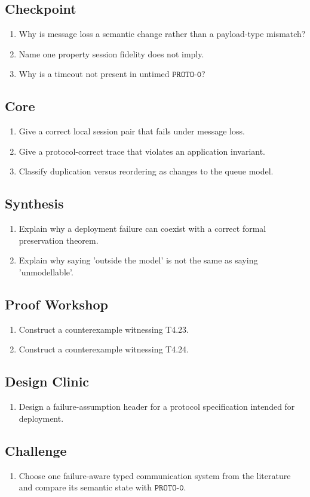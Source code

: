 \subsection*{Checkpoint}
\begin{enumerate}[label=\textbf{11.\arabic*},start=1]
\item Why is message loss a semantic change rather than a payload-type mismatch?
\item Name one property session fidelity does not imply.
\item Why is a timeout not present in untimed $\texttt{PROTO-0}$?
\end{enumerate}
\subsection*{Core}
\begin{enumerate}[label=\textbf{11.\arabic*},start=4]
\item Give a correct local session pair that fails under message loss.
\item Give a protocol-correct trace that violates an application invariant.
\item Classify duplication versus reordering as changes to the queue model.
\end{enumerate}
\subsection*{Synthesis}
\begin{enumerate}[label=\textbf{11.\arabic*},start=7]
\item Explain why a deployment failure can coexist with a correct formal preservation theorem.
\item Explain why saying 'outside the model' is not the same as saying 'unmodellable'.
\end{enumerate}
\subsection*{Proof Workshop}
\begin{enumerate}[label=\textbf{11.\arabic*},start=9]
\item Construct a counterexample witnessing T4.23.
\item Construct a counterexample witnessing T4.24.
\end{enumerate}
\subsection*{Design Clinic}
\begin{enumerate}[label=\textbf{11.\arabic*},start=11]
\item Design a failure-assumption header for a protocol specification intended for deployment.
\end{enumerate}
\subsection*{Challenge}
\begin{enumerate}[label=\textbf{11.\arabic*},start=12]
\item Choose one failure-aware typed communication system from the literature and compare its semantic state with $\texttt{PROTO-0}$.
\end{enumerate}
